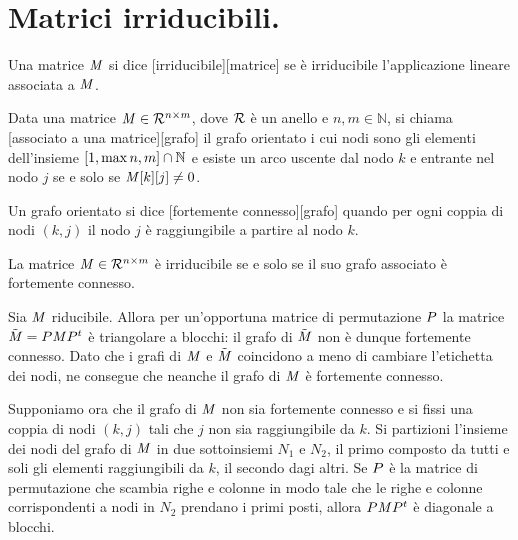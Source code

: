 \section{Matrici irriducibili.}\label{MatriciIrriducibili}
\begin{Definition}
	Una matrice $\mathit{M}$ si dice [irriducibile][matrice] se \`e irriducibile l'applicazione lineare associata a $\mathit{M}$.
\end{Definition}
\begin{Definition}
	Data una matrice $\mathit{M} \in \mathcal{R}^{n \times m}$, dove $\mathcal{R}$ \`e un anello e $n, m \in \mathbb{N}$, si chiama [associato a una matrice][grafo] il grafo orientato i cui nodi sono gli elementi dell'insieme $[1,\max{n,m}] \cap \mathbb{N}$ e esiste un arco uscente dal nodo $k$ e entrante nel nodo $j$ se e solo se $\mathit{M}[k][j] \neq 0$.
\end{Definition}
\begin{Definition}
	Un grafo orientato si dice [fortemente connesso][grafo] quando per ogni coppia di nodi $(k,j)$ il nodo $j$ \`e raggiungibile a partire al nodo $k$.
\end{Definition}
\begin{Theorem}
	La matrice $\mathit{M} \in \mathcal{R}^{n \times m}$ \`e irriducibile se e solo se il suo grafo associato \`e fortemente connesso.
\end{Theorem}
\Proof Sia $\mathit{M}$ riducibile. Allora per un'opportuna matrice di permutazione $P$ la matrice $\tilde{\mathit{M}} = P\mathit{M}{P}^t$ \`e triangolare a blocchi: il grafo di $\tilde{\mathit{M}}$ non \`e dunque fortemente connesso. Dato che i grafi di $\mathit{M}$ e $\tilde{\mathit{M}}$ coincidono a meno di cambiare l'etichetta dei nodi, ne consegue che neanche il grafo di $\mathit{M}$ \`e fortemente connesso.
\par Supponiamo ora che il grafo di $\mathit{M}$ non sia fortemente connesso e si fissi una coppia di nodi $(k,j)$ tali che $j$ non sia raggiungibile da $k$. Si partizioni l'insieme dei nodi del grafo di $\mathit{M}$ in due sottoinsiemi $N_1$ e $N_2$, il primo composto da tutti e soli gli elementi raggiungibili da $k$, il secondo dagi altri. Se $P$ \`e la matrice di permutazione che scambia righe e colonne in modo tale che le righe e colonne corrispondenti a nodi in $N_2$ prendano i primi posti, allora $P\mathit{M}{P}^t$ \`e diagonale a blocchi. \EndProof
